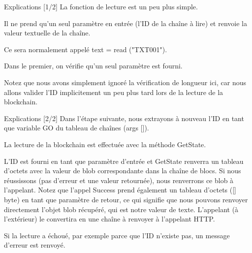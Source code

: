 \documentclass[presentation]{beamer}
\begin{document}
\begin{frame}[label={sec:orge2d08dc}]{Explications [1/2]}
La fonction de lecture est un peu plus simple. 

Il ne prend qu'un seul paramètre en entrée (l'ID de la chaîne à lire) et renvoie la valeur textuelle de la chaîne. 

Ce sera normalement appelé text = read ("TXT001"). 

Dans le premier, on vérifie qu'un seul paramètre est fourni. 

Notez que nous avons simplement ignoré la vérification de longueur ici, car nous allons valider l'ID implicitement 
un peu plus tard lors de la lecture de la blockchain.
\end{frame}

\begin{frame}[label={sec:org5b91371}]{Explications [2/2]}
Dans l'étape suivante, nous extrayons à nouveau l'ID en tant que variable GO du tableau de chaînes (args []).

La lecture de la blockchain est effectuée avec la méthode GetState. 

L'ID est fourni en tant que paramètre d'entrée et GetState renverra un tableau d'octets avec la valeur de blob 
correspondante dans la chaîne de blocs. Si nous réussissons (pas d'erreur et une valeur retournée), nous 
renverrons ce blob à l'appelant. Notez que l'appel Success prend également un tableau d'octets ([] byte) en 
tant que paramètre de retour, ce qui signifie que nous pouvons renvoyer directement l'objet blob récupéré, qui 
est notre valeur de texte. L'appelant (à l'extérieur) le convertira en une chaîne à renvoyer à l'appelant HTTP.

Si la lecture a échoué, par exemple parce que l'ID n'existe pas, un message d'erreur est renvoyé.
\end{frame}
\end{document}
